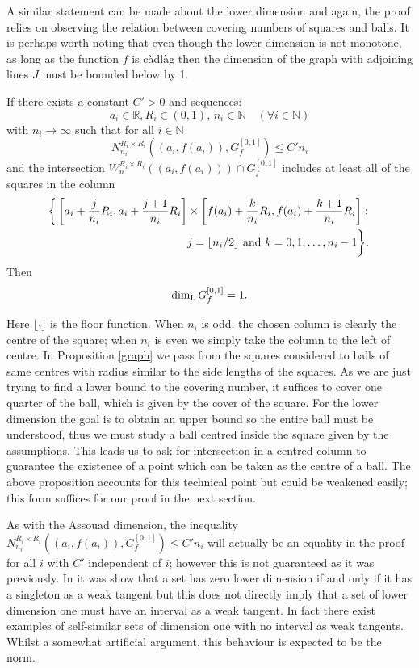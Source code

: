 A similar statement can be made about the lower dimension and again, the proof relies on observing the relation between covering numbers of squares and balls. It is perhaps worth noting that even though the lower dimension is not monotone, as long as the function $f$ is c\`adl\`ag then the dimension of the graph with adjoining lines $J$ must be bounded below by 1.
\begin{proposition}\label{graph-lower}
	If there exists a constant $C'>0$ and sequences:
	\[
	a_i\in \mathbb{R},R_i\in (0,1),\, n_i\in\mathbb{N} \quad (\forall i\in \mathbb{N})
	\]
	with $n_i \rightarrow \infty$ such that for all $i\in\mathbb{N}$
	\[
	N_{n_i}^{R_i \times R_i }((a_i,f(a_i)),G_f^{[0,1]})\leq C' n_i
	\]
	and the intersection $W_n^{R_i \times R_i}((a_i,f(a_i))) \cap G_f^{[0,1]}$ includes at least all of the squares in the column 
	\begin{align*}
	    	\bigg\{ \left[a_i + \frac{j}{n_i}R_i, a_i + \frac{j+1}{n_i}R_i \right] &\times \left[f(a_i) + \frac{k}{n_i}R_i, f(a_i) + \frac{k+1}{n_i}R_i \right] \colon \\
	    	&j = \lfloor n_i/2 \rfloor \textup{ and } k = 0, 1,\ldots, n_i - 1 \bigg\}.
	\end{align*}
	Then
	\[
	\dim_{\textup{L}} G_f^{[0,1]}=1.
	\]
\end{proposition}

Here $\lfloor \cdot \rfloor$ is the floor function. When $n_i$ is odd. the chosen column is clearly the centre of the square; when $n_i$ is even we simply take the column to the left of centre. In Proposition \ref{graph} we pass from the squares considered to balls of same centres with radius similar to the side lengths of the squares. As we are just trying to find a lower bound to the covering number, it suffices to cover one quarter of the ball, which is given by the cover of the square. For the lower dimension the goal is to obtain an upper bound so the entire ball must be understood, thus we must study a ball centred inside the square given by the assumptions. This leads us to ask for intersection in a centred column to guarantee the existence of a point which can be taken as the centre of a ball. The above proposition accounts for this technical point but could be weakened easily; this form suffices for our proof in the next section.

As with the Assouad dimension, the inequality $N_{n_i}^{R_i \times R_i }((a_i,f(a_i)),G_f^{[0,1]})\leq C' n_i$ will actually be an equality in the proof for all $i$ with $C'$ independent of $i$; however this is not guaranteed as it was previously. In \cite{microsets} it was show that a set has zero lower dimension if and only if it has a singleton as a weak tangent but this does not directly imply that a set of lower dimension one must have an interval as a weak tangent. In fact there exist examples of self-similar sets of dimension one with no interval as weak tangents. Whilst a somewhat artificial argument, this behaviour is expected to be the norm.


